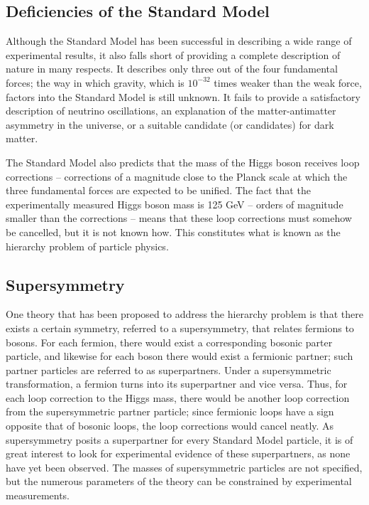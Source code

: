 \subsection{Deficiencies of the Standard Model\label{sec:SMdeficiencies}}

Although the Standard Model has been successful in describing a wide range of experimental results, it also falls short of providing a complete description of nature in many respects. It describes only three out of the four fundamental forces; the way in which gravity, which is $10^{-32}$ times weaker than the weak force, factors into the Standard Model is still unknown. It fails to provide a satisfactory description of neutrino oscillations, an explanation of the matter-antimatter asymmetry in the universe, or a suitable candidate (or candidates) for dark matter.

The Standard Model also predicts that the mass of the Higgs boson receives loop corrections -- corrections of a magnitude close to the Planck scale at which the three fundamental forces are expected to be unified. The fact that the experimentally measured Higgs boson mass is 125 GeV -- orders of magnitude smaller than the corrections -- means that these loop corrections must somehow be cancelled, but it is not known how. This constitutes what is known as the hierarchy problem of particle physics.

\subsection{Supersymmetry}

One theory that has been proposed to address the hierarchy problem is that there exists a certain symmetry, referred to a supersymmetry, that relates fermions to bosons. For each fermion, there would exist a corresponding bosonic parter particle, and likewise for each boson there would exist a fermionic partner; such partner particles are referred to as superpartners. Under a supersymmetric transformation, a fermion turns into its superpartner and vice versa. Thus, for each loop correction to the Higgs mass, there would be another loop correction from the supersymmetric partner particle; since fermionic loops have a sign opposite that of bosonic loops, the loop corrections would cancel neatly.
As supersymmetry posits a superpartner for every Standard Model particle, it is of great interest to look for experimental evidence of these superpartners, as none have yet been observed. The masses of supersymmetric particles are not specified, but the numerous parameters of the theory can be constrained by experimental measurements.

